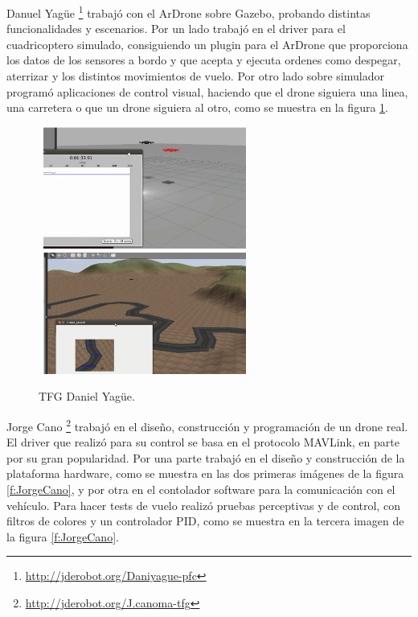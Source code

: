 \hspace{1 cm} Danuel Yag\"ue \footnote{\url{http://jderobot.org/Daniyague-pfc}} \cite{MediaWikiDanielYagueSanchez} trabaj\'o con el ArDrone sobre Gazebo, probando distintas funcionalidades y escenarios. Por un lado trabaj\'o en el driver para el cuadricoptero simulado, consiguiendo un plugin para el ArDrone que proporciona los datos de los sensores a bordo y que acepta y ejecuta ordenes como despegar, aterrizar y los distintos movimientos de vuelo. Por otro lado sobre simulador program\'o aplicaciones de control visual, haciendo que el drone siguiera una linea, una carretera o que un drone siguiera al otro, como se muestra en la figura \ref{f:DanielYague}.
\begin{figure}[H]
 \centering
    \includegraphics[width=7cm,height=4cm]{imgs/DaniYague1_1.png}
    \includegraphics[width=7cm,height=4cm]{imgs/DaniYague2_1.png}
 \caption{TFG Daniel Yag\"ue.}
 \label{f:DanielYague}
\end{figure} 


\hspace{1 cm} Jorge Cano \footnote{\url{http://jderobot.org/J.canoma-tfg}} \cite{MediaWikiJorgeCanoMartinez} trabaj\'o en el diseño, construcci\'on y programaci\'on de un drone real. El driver que realiz\'o para su control se basa en el protocolo MAVLink, en parte por su gran popularidad. Por una parte trabaj\'o en el diseño y construcci\'on de la plataforma hardware, como se muestra en las dos primeras im\'agenes de la figura \ref{f:JorgeCano}, y por otra en el contolador software para la comunicaci\'on con el veh\'iculo. Para hacer tests de vuelo realiz\'o pruebas perceptivas y de control, con filtros de colores y un controlador PID, como se muestra en la tercera imagen de la figura \ref{f:JorgeCano}.

